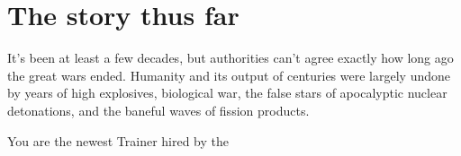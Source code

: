 \chapter{The story thus far}
\label{chap:story}
It's been at least a few decades, but authorities can't
  agree exactly how long ago the great wars ended.
Humanity and its output of centuries were largely undone by
 years of high explosives, biological war, the false stars
 of apocalyptic nuclear detonations, and the baneful
 waves of fission products.

You are the newest Trainer hired by the 
